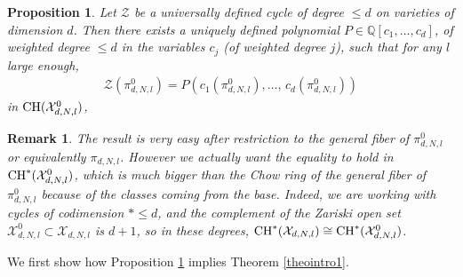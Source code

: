 \documentclass[10pt]{article}
\newtheorem{prop}[theo]{Proposition}
\newtheorem{rema}[theo]{Remark}
\begin{document}
\begin{prop}\label{proCIr=1} Let $\mathcal{Z}$ be a universally defined cycle of degree $\leq d$ on  varieties of dimension $d$. Then there exists
a uniquely defined polynomial $P\in \mathbb{Q}[c_{1},\ldots,c_{d}]$, of weighted degree
$\leq d$ in the variables $c_{j}$ (of weighted degree $j$),  such that for  any $l$ large enough,
\begin{eqnarray}\label{eqCINl}
\mathcal{Z}(\pi_{d,N,l}^0)= P(c_1(\pi_{d,N,l}^0),\ldots,\,c_{d}
(\pi_{d,N,l}^0))
\end{eqnarray} in ${\rm CH}(\mathcal{X}^0_{d,N,l})$,
\end{prop}
\begin{rema} \label{remadu31juil} {\rm  The result is very easy  after restriction to the general fiber of $\pi_{d,N,l}^0$ or equivalently $\pi_{d,N,l}$. However we actually want the equality to hold in ${\rm CH}^*(\mathcal{X}^0_{d,N,l})$,  which  is much bigger than the Chow ring of the general fiber of $\pi_{d,N,l}^0$ because of the classes coming from the base. Indeed, we are working with cycles of codimension  $*\leq d$, and the complement of the Zariski open set $\mathcal{X}^0_{d,N,l}\subset \mathcal{X}_{d,N,l}$ is $d+1$, so in these degrees, ${\rm CH}^*(\mathcal{X}_{d,N,l})\cong {\rm CH}^*(\mathcal{X}^0_{d,N,l})$.}
\end{rema}
We  first show how Proposition \ref{proCIr=1} implies Theorem \ref{theointro1}.
\end{document}

